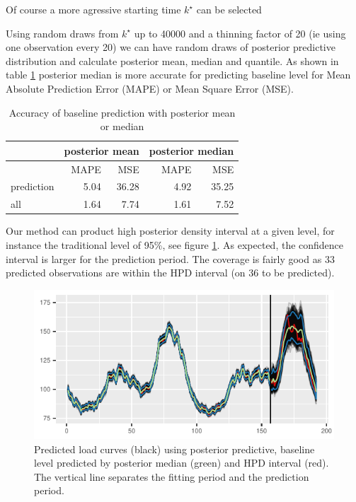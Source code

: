 \documentclass[journal]{IEEEtran}
\begin{document}
Of course a more agressive starting time $k^\star$   can be selected


Using random draws from $k^\star$ up to 40000 and a thinning factor of
20 (ie using one observation every 20) we can have random draws of
posterior predictive distribution and calculate posterior mean, median
and quantile. As shown in table \ref{tab:map} posterior median is more
accurate for predicting baseline level for Mean Absolute Prediction
Error (MAPE) or Mean Square Error (MSE).
\begin{table}
 \begin{center}
  \begin{tabular}{lrrrr}\hline\hline
&\multicolumn{2}{c}{posterior mean}&\multicolumn{2}{c}{posterior median}\\\hline
          &MAPE & MSE & MAPE&  MSE\\\hline
prediction&5.04&36.28&4.92&35.25\\
all       &1.64& 7.74&1.61& 7.52\\\hline
\end{tabular}
  \end{center}
\caption{Accuracy of baseline prediction with posterior mean or median}
  \label{tab:map}
\end{table}

Our method can product high posterior density interval at a given
level, for instance the traditional level of 95\%, see figure
\ref{fig:ICY}. As expected, the confidence interval is larger for the
prediction period. The coverage is fairly good as 33 predicted
observations are within the HPD interval (on 36 to be predicted).
\begin{figure}[!h]
  \centering
  \includegraphics{ICY}
  \caption{Predicted load curves (black) using posterior predictive,
    baseline level predicted by posterior median (green) and HPD
    interval (red). The vertical line separates the fitting period and
    the prediction period.}
  \label{fig:ICY}
\end{figure}
\end{document}
